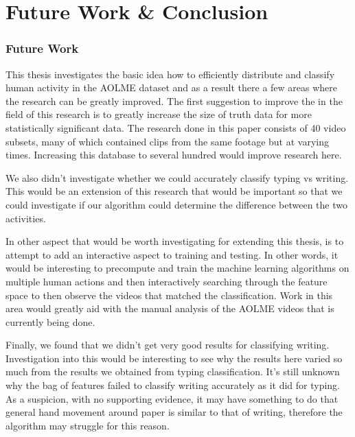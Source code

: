 \chapter{Future Work \& Conclusion}
\subsection{Future Work}
This thesis investigates the basic idea how to efficiently distribute and classify
human activity in the AOLME dataset and as a result there a few areas where the
research can be greatly improved. The first suggestion to improve the in the field
of this research is to greatly increase the size of truth data for more
statistically significant data. The research done in this paper consists of 40 video
subsets, many of which contained clips from the same footage but at varying times.
Increasing this database to several hundred would improve research here.

We also didn't investigate whether we could accurately classify typing vs writing.
This would be an extension of this research that would be important so that we
could investigate if our algorithm could determine the difference between the two
activities.

In other aspect that would be worth investigating for extending this thesis,
is to attempt to add an interactive aspect to training and testing. In other words,
it would be interesting to precompute and train the machine learning algorithms
on multiple human actions and then interactively searching through the feature
space to then observe the videos that matched the classification. Work in this
area would greatly aid with the manual analysis of the AOLME videos that is
currently being done.

Finally, we found that we didn't get very good results for classifying writing.
Investigation into this would be interesting to see why the results here varied
so much from the results we obtained from typing classification. It's still unknown
why the bag of features failed to classify writing accurately as it did for typing.
As a suspicion, with no supporting evidence, it may have something to do that
general hand movement around paper is similar to that of writing, therefore the
algorithm may struggle for this reason.

